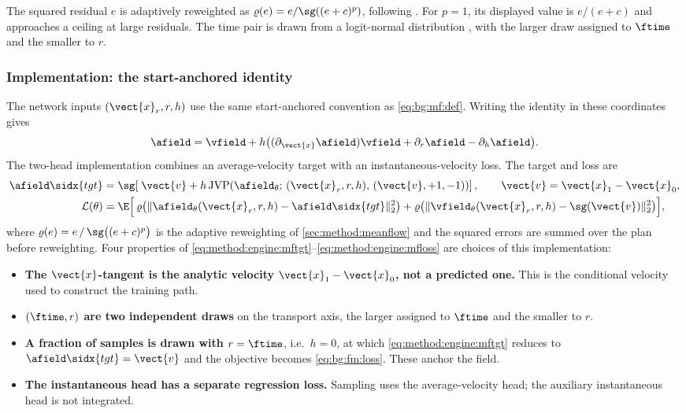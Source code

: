 The squared residual $e$ is adaptively reweighted as
$\varrho(e)=e/\sg((e+c)^{p})$, following \parencite[Sec.~4.3]{geng2025meanflow}.
For $p=1$, its displayed value is $e/(e+c)$ and approaches a ceiling at large residuals.
The time pair is drawn from a logit-normal distribution \parencite{esser2024scaling}, with the
larger draw assigned to $\ftime$ and the smaller to $r$.

\subsubsection*{Implementation: the start-anchored identity}

The network inputs $(\vect{x}_{r},r,h)$ use the same start-anchored convention as
\eqref{eq:bg:mf:def}. Writing the identity in these coordinates gives
\begin{equation}\label{eq:method:engine:mfid}
  \afield=\vfield+h\big((\partial_{\vect{x}}\afield)\vfield
                            +\partial_r\afield-\partial_h\afield\big).
\end{equation}
The two-head implementation combines an average-velocity target with an instantaneous-velocity
loss. The target and loss are
\begin{align}
  \afield\sidx{tgt}
    &= \sg\!\left[\;\vect{v} + h\,
       \mathrm{JVP}\!\left(\afield_{\theta};\,
         (\vect{x}_{r},r,h),\,(\vect{v},+1,-1)\right)\right],
       \qquad \vect{v} = \vect{x}_{1}-\vect{x}_{0},
       \label{eq:method:engine:mftgt}\\
  \mathcal{L}(\theta)
    &= \E\Big[\,
        \varrho\big(\|\afield_{\theta}(\vect{x}_{r},r,h) - \afield\sidx{tgt}\|_{2}^{2}\big)
      + \varrho\big(\|\vfield_{\theta}(\vect{x}_{r},r,h) - \sg(\vect{v})\|_{2}^{2}\big)\Big],
       \label{eq:method:engine:mfloss}
\end{align}
where $\varrho(e) = e\,/\,\sg\big((e+c)^{p}\big)$ is the adaptive reweighting of
\autoref{sec:method:meanflow} and the squared errors are summed over the plan before reweighting.
Four properties of \eqref{eq:method:engine:mftgt}--\eqref{eq:method:engine:mfloss} are choices of
this implementation:

\begin{itemize}
  \item \textbf{The $\vect{x}$-tangent is the analytic velocity $\vect{x}_{1}-\vect{x}_{0}$, not a
    predicted one.} This is the conditional velocity used to construct the training path.
  \item \textbf{$(\ftime,r)$ are two independent draws} on the transport axis, the larger
    assigned to $\ftime$ and the smaller to $r$.
  \item \textbf{A fraction of samples is drawn with $r = \ftime$}, i.e.\ $h=0$, at which
    \eqref{eq:method:engine:mftgt} reduces to $\afield\sidx{tgt} = \vect{v}$ and the objective
    becomes \eqref{eq:bg:fm:loss}. These anchor the field.
  \item \textbf{The instantaneous head has a separate regression loss.} Sampling uses the
    average-velocity head; the auxiliary instantaneous head is not integrated.
\end{itemize}

